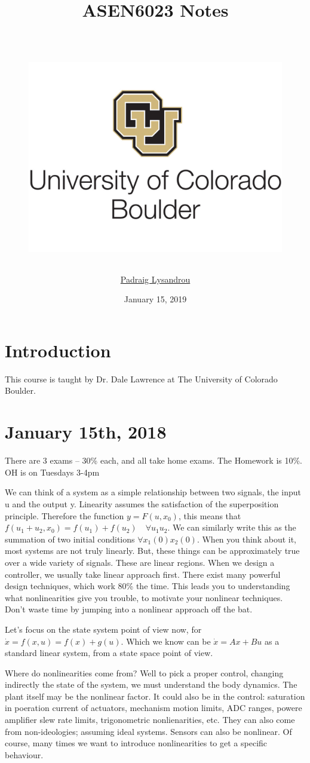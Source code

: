 \documentclass[11pt]{article}
\title{	
    {ASEN6023 Notes}\\
    {\hspace{1cm}}\\
	{\begin{figure}[!htbp]\centering\includegraphics[scale= 0.65]{boulderlogo.jpg}\end{figure}}
    }
\date{January 15, 2019}
\author{\href{mailto:padraig.lysandrou@colorado.edu}{Padraig Lysandrou}}
\begin{document}
\maketitle



\newpage
\section{Introduction}
This course is taught by Dr. Dale Lawrence at The University of Colorado Boulder.

\newpage
\section*{January 15th, 2018}
There are 3 exams -- 30\% each, and all take home exams. The Homework is 10\%. OH is on Tuesdays 3-4pm

We can think of a system as a simple relationship between two signals, the input u and the output y. Linearity assumes the satisfaction of the superposition principle. Therefore the function $y=F(u,x_0)$, this means that $f(u_1+u_2,x_0) = f(u_1)+f(u_2) \quad \forall u_1 u_2$. We can similarly write this as the summation of two initial conditions $\forall x_1(0) x_2(0)$. When you think about it, most systems are not truly linearly. But, these things can be approximately true over a wide variety of signals. These are linear regions. When we design a controller, we usually take linear approach first. There exist many powerful design techniques, which work 80\% the time. This leads you to understanding what nonlinearities give you trouble, to motivate your nonlinear techniques. Don't waste time by jumping into a nonlinear approach off the bat. 

Let's focus on the state system point of view now, for $\dot{x} = f(x,u) = f(x) + g(u)$. Which we know can be $\dot{x} = Ax + Bu$ as a standard linear system, from a state space point of view. 

Where do nonlinearities come from?  Well to pick a proper control, changing indirectly the state of the system, we must understand the body dynamics. The plant itself may be the nonlinear factor. It could also be in the control: saturation in poeration current of actuators, mechanism motion limits, ADC ranges, powere amplifier slew rate limits, trigonometric nonlienarities, etc. They can also come from non-ideologies; assuming ideal systems. Sensors can also be nonlinear. Of course, many times we want to introduce nonlinearities to get a specific behaviour. 
\end{document}
